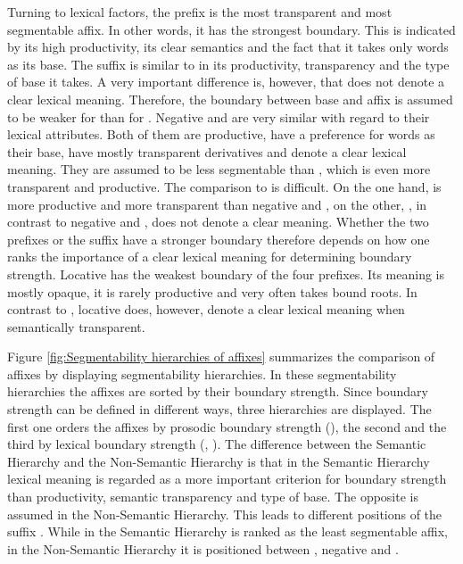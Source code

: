 Turning to lexical factors, the prefix  is the most transparent and most segmentable affix. In other words, it has the strongest boundary. This is indicated by its high productivity, its clear semantics and the fact that it takes only words as its base. The suffix  is similar to  in its productivity, transparency and the type of base it takes. A very important difference is, however, that  does not denote a clear lexical meaning. Therefore, the boundary between base and affix is assumed to be weaker for  than for  . 
Negative  and  are very similar with regard to their lexical attributes. Both of them are productive, have a preference for words as their base, have mostly transparent derivatives and denote a clear lexical meaning. They are assumed to be less segmentable than , which is even more transparent and productive. The comparison to  is difficult. On the one hand,  is more productive and more transparent than negative  and , on the other, , in contrast to negative  and , does not denote a clear meaning. Whether the two prefixes or the suffix have a stronger boundary therefore depends on how one ranks the importance of a clear lexical meaning for determining boundary strength. Locative  has the weakest boundary of the four prefixes. Its meaning is mostly opaque, it is rarely productive and very often takes bound roots. In contrast to , locative  does, however, denote a clear lexical meaning when semantically transparent.


Figure \ref{fig:Segmentability hierarchies of  affixes} summarizes the comparison of affixes by displaying segmentability hierarchies. In these segmentability hierarchies the affixes are sorted by their boundary strength. Since boundary strength can be defined in different ways, three hierarchies are displayed. The first one orders the affixes by prosodic boundary strength (), the second and the third by lexical boundary strength (, ). The difference between the {Semantic Hierarchy} and the {Non-Semantic Hierarchy} is that in the {Semantic Hierarchy}  lexical meaning is regarded as a more important criterion for boundary strength than productivity, semantic transparency and type of base. The opposite is assumed in the {Non-Semantic Hierarchy}. This leads to different positions of the suffix . While in the {Semantic Hierarchy}  is ranked as the least segmentable affix, in the {Non-Semantic Hierarchy} it is positioned between , negative  and .

